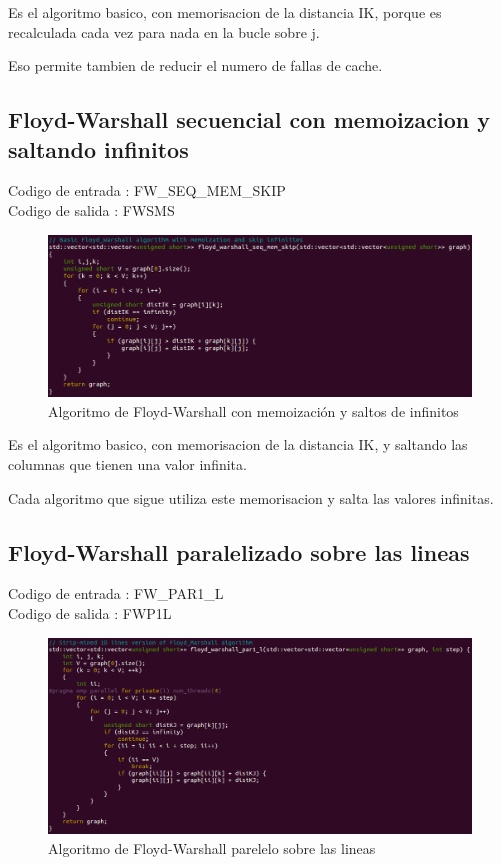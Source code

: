 \documentclass[a4paper,11pt]{article}
\begin{document}
Es el algoritmo basico, con memorisacion de la distancia IK, porque es recalculada cada vez para nada en la bucle sobre j.

Eso permite tambien de reducir el numero de fallas de cache.

\subsection{Floyd-Warshall secuencial con memoizacion y saltando infinitos}

\noindent Codigo de entrada : FW\_SEQ\_MEM\_SKIP \\
Codigo de salida : FWSMS

\begin{figure}[H]
\begin{center}
  \includegraphics[scale=0.6]{FW_SEQ_MEM_SKIP.png}
  \caption{Algoritmo de Floyd-Warshall con memoización y saltos de infinitos}
\end{center}
\end{figure}

Es el algoritmo basico, con memorisacion de la distancia IK, y saltando las columnas que tienen una valor infinita.

Cada algoritmo que sigue utiliza este memorisacion y salta las valores infinitas.

\subsection{Floyd-Warshall paralelizado sobre las lineas}

\noindent Codigo de entrada : FW\_PAR1\_L \\
Codigo de salida : FWP1L

\begin{figure}[H]
\begin{center}
  \includegraphics[scale=0.6]{FW_PAR1_L.png}
  \caption{Algoritmo de Floyd-Warshall parelelo sobre las lineas}
\end{center}
\end{figure}
\end{document}
